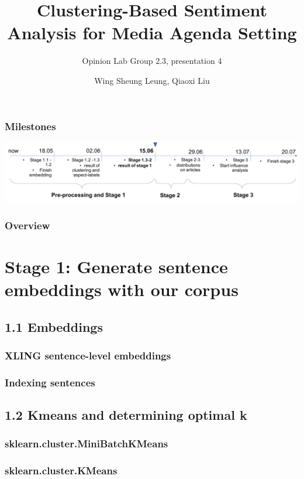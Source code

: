 \documentclass{tum-presentation}
\title[Shortened Title]{Clustering-Based Sentiment Analysis for Media Agenda Setting}
\subtitle{Opinion Lab Group 2.3, presentation 4}
\author{Wing Sheung Leung, Qiaoxi Liu}
\begin{document}
\begin{frame}[noframenumbering]
  \titlepage
\end{frame}


\begin{frame}
  \frametitle{Milestones}
  \vspace{2cm}
 \includegraphics[width = \textwidth]{figures/timeline.pdf}
\end{frame}


\begin{frame}[t]
  \frametitle{Overview}
  \tableofcontents[sectionstyle=show,subsectionstyle=show,subsubsectionstyle=shaded]
\end{frame}


\section{Stage 1: Generate sentence embeddings with our corpus}
\subsection[shaded]{1.1 Embeddings}
\subsubsection{XLING sentence-level embeddings}
\subsubsection{Indexing sentences}
\subsection{1.2 Kmeans and determining optimal k}
\subsubsection{sklearn.cluster.MiniBatchKMeans}
\subsubsection{sklearn.cluster.KMeans}
\end{document}
